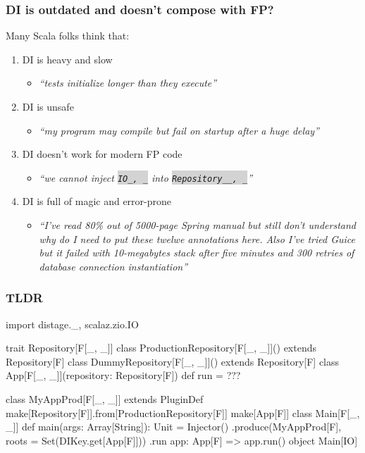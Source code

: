 \documentclass[usenames,dvipsnames]{beamer}
\newcommand{\code}[1]{\colorbox{lightgray}{\texttt{#1}}}
\begin{document}
\begin{frame}
\frametitle{DI is outdated and doesn't compose with FP?}
  Many Scala folks think that:
  \begin{enumerate}
  \item DI is heavy and slow
  \begin{itemize}
    \item \textit{``tests initialize longer than they execute''}
  \end{itemize}
  \item DI is unsafe
  \begin{itemize}
    \item \textit{``my program may compile but fail on startup after a huge delay''}
  \end{itemize}
  \item DI doesn't work for modern FP code
  \begin{itemize}
    \item \textit{``we cannot inject \code{IO\lbrack\_, \_\rbrack} into \code{Repository\lbrack\_\lbrack\_, \_\rbrack\rbrack}''}
  \end{itemize}
  \item DI is full of magic and error-prone
  \begin{itemize}
    \item \textit{``I've read 80\% out of 5000-page Spring manual but still don't understand why do I need to put these twelwe annotations here.
    Also I've tried Guice but it failed with 10-megabytes stack after five minutes and 300 retries of database connection instantiation''}
  \end{itemize}
  \end{enumerate}


\end{frame}

\begin{frame}[fragile]
\frametitle{TLDR}
  \begin{scalacode}
import distage._, scalaz.zio.IO

trait Repository[F[_, _]] {}
class ProductionRepository[F[_, _]]() extends Repository[F]
class DummyRepository[F[_, _]]() extends Repository[F]
class App[F[_, _]](repository: Repository[F]) { def run = ??? }

class MyAppProd[F[_, _]] extends PluginDef {
  make[Repository[F]].from[ProductionRepository[F]]
  make[App[F]]
}
class Main[F[_, _]] { def main(args: Array[String]): Unit = {
  Injector()
    .produce(MyAppProd[F], roots = Set(DIKey.get[App[F]]))
    .run { app: App[F] => app.run() }
}}
object Main[IO]
  \end{scalacode}
\end{frame}
\end{document}
